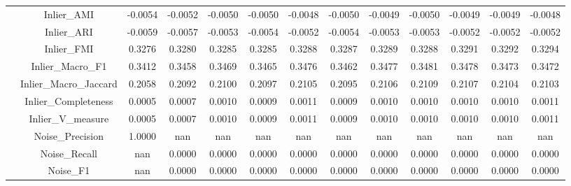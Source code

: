 \begin{table}[ht!]
\begin{tabular*}{\linewidth}{@{} lc c c c c c c c c c c c @{}}
 & Inlier_AMI  & -0.0054 & -0.0052 & -0.0050 & -0.0050 & -0.0048 & -0.0050 & -0.0049 & -0.0050 & -0.0049 & -0.0049 & -0.0048 \\

 & Inlier_ARI  & -0.0059 & -0.0057 & -0.0053 & -0.0054 & -0.0052 & -0.0054 & -0.0053 & -0.0053 & -0.0052 & -0.0052 & -0.0052 \\

 & Inlier_FMI  & 0.3276 & 0.3280 & 0.3285 & 0.3285 & 0.3288 & 0.3287 & 0.3289 & 0.3288 & 0.3291 & 0.3292 & 0.3294 \\

 & Inlier_Macro_F1  & 0.3412 & 0.3458 & 0.3469 & 0.3465 & 0.3476 & 0.3462 & 0.3477 & 0.3481 & 0.3478 & 0.3473 & 0.3472 \\

 & Inlier_Macro_Jaccard  & 0.2058 & 0.2092 & 0.2100 & 0.2097 & 0.2105 & 0.2095 & 0.2106 & 0.2109 & 0.2107 & 0.2104 & 0.2103 \\

 & Inlier_Completeness  & 0.0005 & 0.0007 & 0.0010 & 0.0009 & 0.0011 & 0.0009 & 0.0010 & 0.0010 & 0.0010 & 0.0010 & 0.0011 \\

 & Inlier_V_measure  & 0.0005 & 0.0007 & 0.0010 & 0.0009 & 0.0011 & 0.0009 & 0.0010 & 0.0010 & 0.0010 & 0.0010 & 0.0011 \\

 & Noise_Precision  & 1.0000 & nan & nan & nan & nan & nan & nan & nan & nan & nan & nan \\

 & Noise_Recall  & nan & 0.0000 & 0.0000 & 0.0000 & 0.0000 & 0.0000 & 0.0000 & 0.0000 & 0.0000 & 0.0000 & 0.0000 \\

 & Noise_F1  & nan & 0.0000 & 0.0000 & 0.0000 & 0.0000 & 0.0000 & 0.0000 & 0.0000 & 0.0000 & 0.0000 & 0.0000 \\
\bottomrule
\end{tabular*}
\end{table}